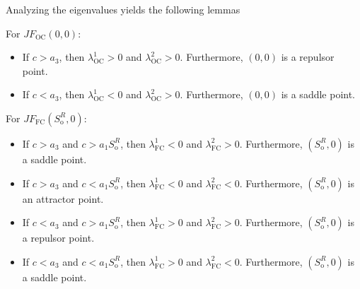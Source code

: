 Analyzing the eigenvalues yields the following lemmas

\begin{lemma}
	For $JF_{\text{OC}}\left(0,0\right)$:
	\begin{itemize}
		\item

		      If $c>a_{3}$, then $\lambda^{1}_{\text{OC}}>0$ and
		      $\lambda^{2}_{\text{OC}}>0$.
		      Furthermore, $\left(0,0\right)$ is a repulsor point.
		\item

		      If $c<a_{3}$, then $\lambda^{1}_{\text{OC}}<0$ and
		      $\lambda^{2}_{\text{OC}}>0$.
		      Furthermore, $\left(0,0\right)$ is a saddle point.
	\end{itemize}
\end{lemma}

\begin{lemma}
	For $JF_{\text{FC}}\left(S^{R}_{\text{o}},0\right)$:
	\begin{itemize}
		\item

		      If $c>a_{3}$ and $c>a_{1}S^{R}_{\text{o}}$, then
		      $\lambda^{1}_{\text{FC}}<0$ and
		      $\lambda^{2}_{\text{FC}}>0$.
		      Furthermore, $\left(S^{R}_{\text{o}},0\right)$ is a saddle point.

		\item

		      If $c>a_{3}$ and $c<a_{1}S^{R}_{\text{o}}$, then
		      $\lambda^{1}_{\text{FC}}<0$ and $\lambda^{2}_{\text{FC}}<0$.
		      Furthermore, $\left(S^{R}_{\text{o}},0\right)$ is an
		      attractor point.

		\item

		      If $c<a_{3}$ and $c>a_{1}S^{R}_{\text{o}}$, then
		      $\lambda^{1}_{\text{FC}}>0$ and $\lambda^{2}_{\text{FC}}>0$.
		      Furthermore, $\left(S^{R}_{\text{o}},0\right)$ is a
		      repulsor point.

		\item

		      If $c<a_{3}$ and $c<a_{1}S^{R}_{\text{o}}$, then
		      $\lambda^{1}_{\text{FC}}>0$ and $\lambda^{2}_{\text{FC}}<0$.
		      Furthermore, $\left(S^{R}_{\text{o}},0\right)$ is a
		      saddle point.
	\end{itemize}
\end{lemma}
